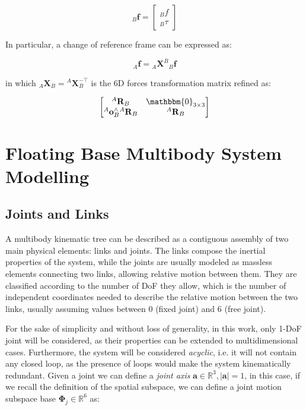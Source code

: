 \begin{equation}
    {}_{B}\mathbf{f} = \begin{bmatrix}
        {}_{B}f \\
        {}_{B}\tau
    \end{bmatrix}
\end{equation}

In particular, a change of reference frame can be expressed as:

\begin{equation}
    {}_{A}\mathbf{f} = {}_{A}\mathbf{X}^B {}_{B}\mathbf{f}
\end{equation}

in which ${}_{A}\mathbf{X}_B = {}^A\mathbf{X}_B ^{-\top}$ is the $6$D forces transformation matrix refined as:

\begin{equation}
    \begin{bmatrix}
        {}^A\mathbf{R}_B                         & \mathbbm{0}_{3 \times 3} \\
        {}^A\mathbf{o}_B^\wedge {}^A\mathbf{R}_B & {}^A\mathbf{R}_B
    \end{bmatrix}
\end{equation}

\section{Floating Base Multibody System Modelling}

\subsection{Joints and Links}

A multibody kinematic tree can be described as a contiguous assembly of two main physical elements: links and joints. The links compose the inertial properties of the system, while the joints are usually modeled as massless elements connecting two links, allowing relative motion between them. They are classified according to the number of \ac{DoF} they allow, which is the number of independent coordinates needed to describe the relative motion between the two links, usually assuming values between 0 (fixed joint) and 6 (free joint).

For the sake of simplicity and without loss of generality, in this work, only 1-\ac{DoF} joint will be considered, as their properties can be extended to multidimensional cases. Furthermore, the system will be considered \textit{acyclic}, i.e. it will not contain any closed loop, as the presence of loops would make the system kinematically redundant.
Given a joint we can define a \textit{joint axis} $\mathbf{a} \in \mathbb{R}^3, |\mathbf{a}| = 1$, in this case, if we recall the definition of the spatial subspace, we can define a joint motion subspace base $\boldsymbol{\Phi} _j \in \mathbb{R} ^6$ as:

